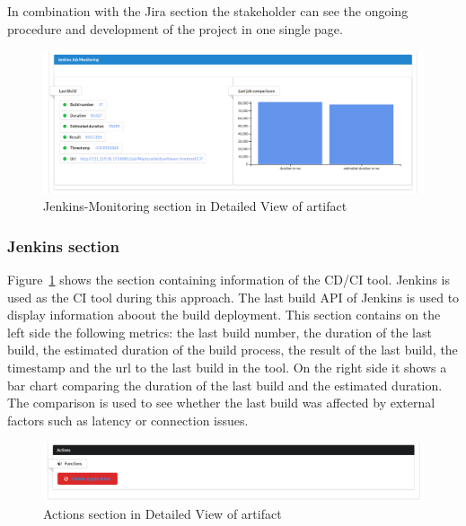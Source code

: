 In combination with the Jira section the stakeholder can see the ongoing procedure and development of the project in one single page.

\begin{figure}[htpb]
  \centering
  \includegraphics[width=1.0\textwidth]{figures/pivio-detailview-jenkins.png} \caption{Jenkins-Monitoring section in Detailed View of artifact}
  \label{fig:pivio-detailedview-jenkins}
\end{figure}
\subsubsection{Jenkins section}

Figure~\ref{fig:pivio-detailedview-jenkins} shows the section containing information of the CD/CI tool. Jenkins is used as the CI tool during this approach. The last build API of Jenkins is used to display information aboout the build deployment. This section contains on the left side the following metrics: the last build number, the duration of the last build, the estimated duration of the build process, the result of the last build, the timestamp and the url to the last build in the tool. On the right side it shows a bar chart comparing the duration of the last build and the estimated duration. The comparison is used to see whether the last build was affected by external factors such as latency or connection issues.

\begin{figure}[htpb]
  \centering
  \includegraphics[width=1.0\textwidth]{figures/pivio-detailview-actions.PNG} \caption{Actions section in Detailed View of artifact}
  \label{fig:pivio-detailedview-actions}
\end{figure}
